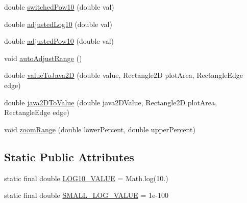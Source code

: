 \begin{DoxyCompactItemize}
\item 
double \mbox{\hyperlink{classorg_1_1jfree_1_1chart_1_1axis_1_1_logarithmic_axis_a1c3f372e3a43658a030bcf4f9d915743}{switched\+Pow10}} (double val)
\item 
double \mbox{\hyperlink{classorg_1_1jfree_1_1chart_1_1axis_1_1_logarithmic_axis_a44a08184863352322f6fdf8923b60780}{adjusted\+Log10}} (double val)
\item 
double \mbox{\hyperlink{classorg_1_1jfree_1_1chart_1_1axis_1_1_logarithmic_axis_a4b3766f7c120bb78b2a3d52edc0f1ad9}{adjusted\+Pow10}} (double val)
\item 
void \mbox{\hyperlink{classorg_1_1jfree_1_1chart_1_1axis_1_1_logarithmic_axis_a0f54dfcb35d307b607012249d644b4a3}{auto\+Adjust\+Range}} ()
\item 
double \mbox{\hyperlink{classorg_1_1jfree_1_1chart_1_1axis_1_1_logarithmic_axis_ae3af543ac00ea122f9396978d8638afb}{value\+To\+Java2D}} (double value, Rectangle2D plot\+Area, Rectangle\+Edge edge)
\item 
double \mbox{\hyperlink{classorg_1_1jfree_1_1chart_1_1axis_1_1_logarithmic_axis_a1152fedcc279d265ff15e36794f7aef8}{java2\+D\+To\+Value}} (double java2\+D\+Value, Rectangle2D plot\+Area, Rectangle\+Edge edge)
\item 
void \mbox{\hyperlink{classorg_1_1jfree_1_1chart_1_1axis_1_1_logarithmic_axis_a78a037d035b03b602adbbd84ba11c352}{zoom\+Range}} (double lower\+Percent, double upper\+Percent)
\end{DoxyCompactItemize}
\subsection*{Static Public Attributes}
\begin{DoxyCompactItemize}
\item 
static final double \mbox{\hyperlink{classorg_1_1jfree_1_1chart_1_1axis_1_1_logarithmic_axis_ae558189ce63d92dfc53aa33fd2fef04c}{L\+O\+G10\+\_\+\+V\+A\+L\+UE}} = Math.\+log(10.)
\item 
static final double \mbox{\hyperlink{classorg_1_1jfree_1_1chart_1_1axis_1_1_logarithmic_axis_a59b4f52df2548c166731021377fac15a}{S\+M\+A\+L\+L\+\_\+\+L\+O\+G\+\_\+\+V\+A\+L\+UE}} = 1e-\/100
\end{DoxyCompactItemize}
